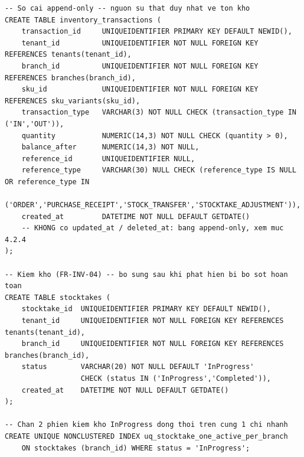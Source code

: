 \begin{lstlisting}
-- So cai append-only -- nguon su that duy nhat ve ton kho
CREATE TABLE inventory_transactions (
    transaction_id     UNIQUEIDENTIFIER PRIMARY KEY DEFAULT NEWID(),
    tenant_id          UNIQUEIDENTIFIER NOT NULL FOREIGN KEY REFERENCES tenants(tenant_id),
    branch_id          UNIQUEIDENTIFIER NOT NULL FOREIGN KEY REFERENCES branches(branch_id),
    sku_id             UNIQUEIDENTIFIER NOT NULL FOREIGN KEY REFERENCES sku_variants(sku_id),
    transaction_type   VARCHAR(3) NOT NULL CHECK (transaction_type IN ('IN','OUT')),
    quantity           NUMERIC(14,3) NOT NULL CHECK (quantity > 0),
    balance_after      NUMERIC(14,3) NOT NULL,
    reference_id       UNIQUEIDENTIFIER NULL,
    reference_type     VARCHAR(30) NULL CHECK (reference_type IS NULL OR reference_type IN
                        ('ORDER','PURCHASE_RECEIPT','STOCK_TRANSFER','STOCKTAKE_ADJUSTMENT')),
    created_at         DATETIME NOT NULL DEFAULT GETDATE()
    -- KHONG co updated_at / deleted_at: bang append-only, xem muc 4.2.4
);

-- Kiem kho (FR-INV-04) -- bo sung sau khi phat hien bi bo sot hoan toan
CREATE TABLE stocktakes (
    stocktake_id  UNIQUEIDENTIFIER PRIMARY KEY DEFAULT NEWID(),
    tenant_id     UNIQUEIDENTIFIER NOT NULL FOREIGN KEY REFERENCES tenants(tenant_id),
    branch_id     UNIQUEIDENTIFIER NOT NULL FOREIGN KEY REFERENCES branches(branch_id),
    status        VARCHAR(20) NOT NULL DEFAULT 'InProgress'
                  CHECK (status IN ('InProgress','Completed')),
    created_at    DATETIME NOT NULL DEFAULT GETDATE()
);

-- Chan 2 phien kiem kho InProgress dong thoi tren cung 1 chi nhanh
CREATE UNIQUE NONCLUSTERED INDEX uq_stocktake_one_active_per_branch
    ON stocktakes (branch_id) WHERE status = 'InProgress';
\end{lstlisting}

